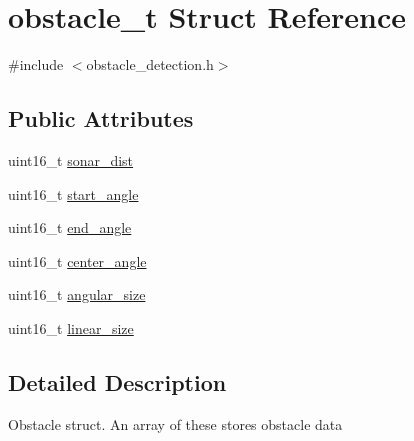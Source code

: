 \hypertarget{structobstacle__t}{\section{obstacle\+\_\+t Struct Reference}
\label{structobstacle__t}
}


{\ttfamily \#include $<$obstacle\+\_\+detection.\+h$>$}

\subsection*{Public Attributes}
\begin{DoxyCompactItemize}
\item 
uint16\+\_\+t \hyperlink{structobstacle__t_a196c79b0e4c77879208400f31d69e33d}{sonar\+\_\+dist}
\item 
uint16\+\_\+t \hyperlink{structobstacle__t_a056f428b29898fdb253738735fd8169c}{start\+\_\+angle}
\item 
uint16\+\_\+t \hyperlink{structobstacle__t_aede591174b61de4068016ba0aba626f0}{end\+\_\+angle}
\item 
uint16\+\_\+t \hyperlink{structobstacle__t_a79faa1d6029c85e932cc56ad126140a9}{center\+\_\+angle}
\item 
uint16\+\_\+t \hyperlink{structobstacle__t_a80604dbaad2331fe2ae468b4cd2cbf6d}{angular\+\_\+size}
\item 
uint16\+\_\+t \hyperlink{structobstacle__t_a67b8df7b656893f775a7aa7cc2ffcc8a}{linear\+\_\+size}
\end{DoxyCompactItemize}


\subsection{Detailed Description}
Obstacle struct. An array of these stores obstacle data 


